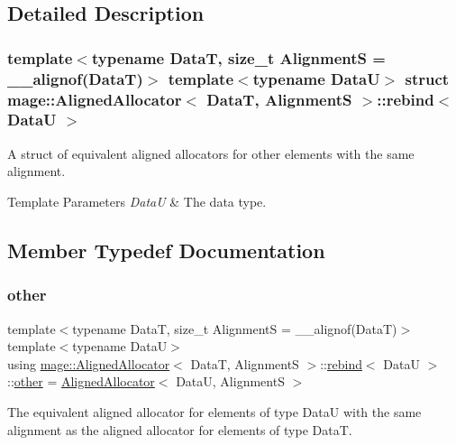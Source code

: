 \subsection{Detailed Description}
\subsubsection*{template$<$typename DataT, size\+\_\+t AlignmentS = \+\_\+\+\_\+alignof(\+Data\+T)$>$\newline
template$<$typename DataU$>$\newline
struct mage\+::\+Aligned\+Allocator$<$ Data\+T, Alignment\+S $>$\+::rebind$<$ Data\+U $>$}

A struct of equivalent aligned allocators for other elements with the same alignment.


\begin{DoxyTemplParams}{Template Parameters}
{\em DataU} & The data type. \\
\hline
\end{DoxyTemplParams}


\subsection{Member Typedef Documentation}
\hypertarget{structmage_1_1_aligned_allocator_1_1rebind_aeb2e9c9add001b8f603f5b67ad8fee56}{}\label{structmage_1_1_aligned_allocator_1_1rebind_aeb2e9c9add001b8f603f5b67ad8fee56} 
\subsubsection{\texorpdfstring{other}{other}}
{\footnotesize\ttfamily template$<$typename DataT, size\+\_\+t AlignmentS = \+\_\+\+\_\+alignof(\+Data\+T)$>$ \\
template$<$typename DataU$>$ \\
using \hyperlink{structmage_1_1_aligned_allocator}{mage\+::\+Aligned\+Allocator}$<$ DataT, AlignmentS $>$\+::\hyperlink{structmage_1_1_aligned_allocator_1_1rebind}{rebind}$<$ DataU $>$\+::\hyperlink{structmage_1_1_aligned_allocator_1_1rebind_aeb2e9c9add001b8f603f5b67ad8fee56}{other} =  \hyperlink{structmage_1_1_aligned_allocator}{Aligned\+Allocator}$<$ DataU, AlignmentS $>$}

The equivalent aligned allocator for elements of type {\ttfamily DataU} with the same alignment as the aligned allocator for elements of type {\ttfamily DataT}. 

